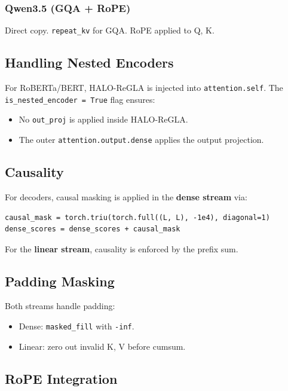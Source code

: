 \subsubsection{Qwen3.5 (GQA + RoPE)}

Direct copy. \texttt{repeat\_kv} for GQA. RoPE applied to Q, K.

\subsection{Handling Nested Encoders}

For RoBERTa/BERT, HALO-ReGLA is injected into \texttt{attention.self}. The 
\texttt{is\_nested\_encoder = True} flag ensures:
\begin{itemize}
\item No \texttt{out\_proj} is applied inside HALO-ReGLA.
\item The outer \texttt{attention.output.dense} applies the output projection.

\end{itemize}
\subsection{Causality}

For decoders, causal masking is applied in the \textbf{dense stream} via:

\begin{lstlisting}
causal_mask = torch.triu(torch.full((L, L), -1e4), diagonal=1)
dense_scores = dense_scores + causal_mask
\end{lstlisting}

For the \textbf{linear stream}, causality is enforced by the prefix sum.

\subsection{Padding Masking}

Both streams handle padding:
\begin{itemize}
\item Dense: \texttt{masked\_fill} with \texttt{-inf}.
\item Linear: zero out invalid K, V before cumsum.

\end{itemize}
\subsection{RoPE Integration}

